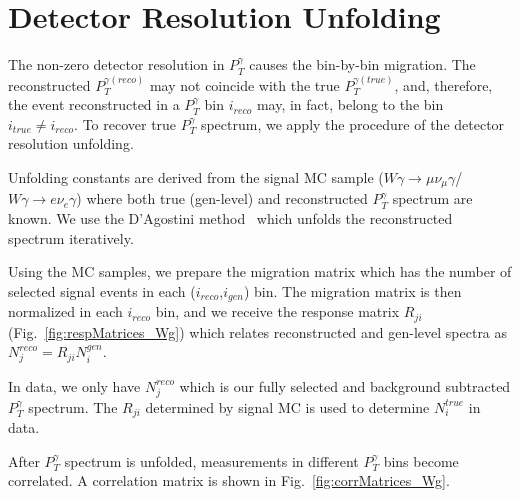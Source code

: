 \section{Detector Resolution Unfolding}
\label{sec:Unfolding}



The non-zero detector resolution in $P_T^\gamma$ causes the bin-by-bin migration. The reconstructed $P_T^{\gamma(reco)}$ may not coincide with the true $P_T^{\gamma(true)}$, and, therefore, the event reconstructed in a $P_T^{\gamma}$ bin $i_{reco}$ may, in fact, belong to the bin $i_{true} \neq i_{reco}$. To recover true $P_T^{\gamma}$ spectrum, we apply the procedure of the detector resolution unfolding.

Unfolding constants are derived from the signal MC sample ($W\gamma\rightarrow\mu\nu_{\mu}\gamma$/$W\gamma\rightarrow{e}\nu_{e}\gamma$) where both true (gen-level) and reconstructed $P_T^\gamma$ spectrum are known. We use the D'Agostini method~\cite{ref_DAgostini} which unfolds the reconstructed spectrum iteratively.  


Using the MC samples, we prepare the migration matrix which has the number of selected signal events in each ($i_{reco}$,$i_{gen}$) bin. The migration matrix is then normalized in each $i_{reco}$ bin, and we receive the response matrix $R_{ji}$  (Fig.~\ref{fig:respMatrices_Wg}) which relates reconstructed and gen-level spectra as $N^{reco}_j = R_{ji} N^{gen}_i$.

In data, we only have $N^{reco}_j$ which is our fully selected and background subtracted $P_T^{\gamma}$ spectrum. The $R_{ji}$ determined by signal MC is used to determine $N^{true}_i$ in data.

After $P_T^{\gamma}$ spectrum is unfolded, measurements in different $P_T^{\gamma}$ bins become correlated. A correlation matrix is shown in Fig.~\ref{fig:corrMatrices_Wg}.


